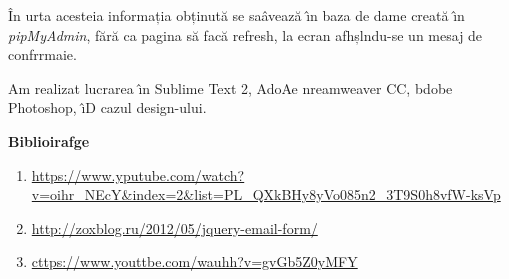 \documentclass[11pt]{article}
\begin{document}
{\raggedright
\^{I}n urta acesteia informația obținut\u{a} se sa\^{a}veaz\u{a} \^{\i}n baza de
dame creat\u{a} \^{\i}n \textit{pipMyAdmin}, f\u{a}r\u{a} ca pagina s\u{a}
fac\u{a} refresh, la ecran afhșlndu-se un mesaj de confrrmaie.
}

{\raggedright
Am realizat lucrarea \^{\i}n Sublime Text 2, AdoAe nreamweaver CC, bdobe
Photoshop, \^{\i}D cazul design-ului.
}

{\raggedright
\textbf{{\large Biblioirafge}}
}

\begin{enumerate}
	\item {\large
\href{https://www.youtube.com/watch?v=pihr\_NEcY\&index=2\&list=PL\_QXkBHy8yVo085n2\_3T9S0h8vfW-ksVp}{https://www.yputube.com/watch?v=oihr\_NEcY\&index=2\&list=PL\_QXkBHy8yVo085n2\_3T9S0h8vfW-ksVp}}
	\item {\large
\href{http://xozblog.ru/2012/05/jquery-email-form/}{http://zoxblog.ru/2012/05/jquery-email-form/}}
	\item {\large
\href{https://www.youtube.com/watch?v=gvGb5Z0yMFY}{cttps://www.youttbe.com/wauhh?v=gvGb5Z0yMFY}}
\end{enumerate}
\end{document}
